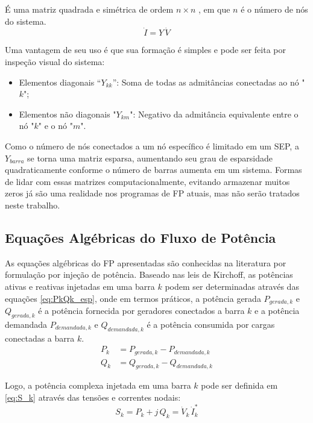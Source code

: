 É uma matriz quadrada e simétrica de ordem
$n \times n$
, em que 
$n$
é o número de nós do sistema.
\begin{equation} \label{eq:I=YV}
    \Dot I = Y \, \Dot V
\end{equation}

Uma vantagem de seu uso é que sua formação é simples e pode ser feita por inspeção visual do sistema:
\begin{itemize}
    \item Elementos diagonais “$Y_{kk}$”: Soma de todas as admitâncias conectadas ao nó "$k$";
    \item Elementos não diagonais "$Y_{km}$": Negativo da admitância equivalente entre o nó "$k$" e o nó "$m$".
\end{itemize}

Como o número de nós conectados a um nó específico é limitado em um \ac{SEP}, a 
${Y_{barra}}$
se torna uma matriz esparsa, aumentando seu grau de esparsidade quadraticamente conforme o número de barras aumenta em um sistema. Formas de lidar com essas matrizes computacionalmente, evitando armazenar muitos zeros já são uma realidade nos programas de \ac{FP} atuais, mas não serão tratados neste trabalho.

\subsection{Equações Algébricas do Fluxo de Potência}

As equações algébricas do \ac{FP} apresentadas são conhecidas na literatura por formulação por injeção de potência.
Baseado nas leis de Kirchoff, as potências ativas e reativas injetadas em uma barra $k$ podem ser determinadas através das equações \eqref{eq:PkQk_esp}, onde em termos práticos, a potência gerada $P_{gerada, k}$ e $Q_{gerada, k}$ é a potência fornecida por geradores conectados a barra $k$ e a potência demandada $P_{demandada, k}$ e $Q_{demandada, k}$ é a potência consumida por cargas conectadas a barra $k$.
\begin{equation} \label{eq:PkQk_esp}
    \begin{split}
        P_k &= P_{gerada,k} - P_{demandada,k} \\
        Q_k &= Q_{gerada,k} - Q_{demandada,k} 
    \end{split}
\end{equation}

Logo, a potência complexa injetada em uma barra $k$ pode ser definida em \eqref{eq:S_k} através das tensões e correntes nodais:
\begin{equation} \label{eq:S_k}
     S_k = P_k + j\,Q_k = \Dot V_k \, \Dot I_k^*
\end{equation}

